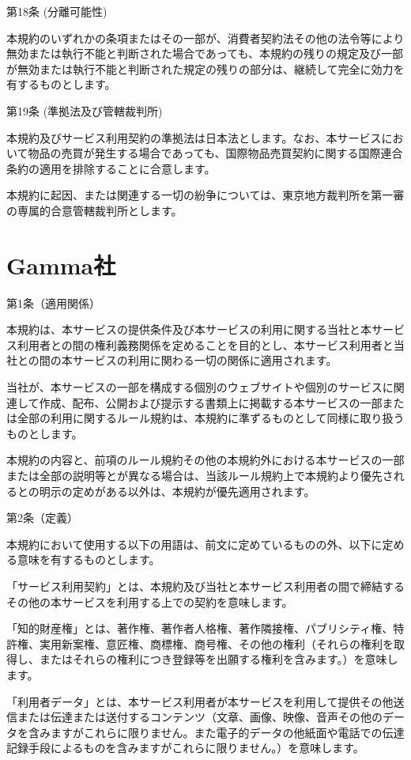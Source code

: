第18条 (分離可能性)

    本規約のいずれかの条項またはその一部が、消費者契約法その他の法令等により無効または執行不能と判断された場合であっても、本規約の残りの規定及び一部が無効または執行不能と判断された規定の残りの部分は、継続して完全に効力を有するものとします。

第19条 (準拠法及び管轄裁判所)

    本規約及びサービス利用契約の準拠法は日本法とします。なお、本サービスにおいて物品の売買が発生する場合であっても、国際物品売買契約に関する国際連合条約の適用を排除することに合意します。

    本規約に起因、または関連する一切の紛争については、東京地方裁判所を第一審の専属的合意管轄裁判所とします。

\section{Gamma社}
第1条（適用関係）

    本規約は、本サービスの提供条件及び本サービスの利用に関する当社と本サービス利用者との間の権利義務関係を定めることを目的とし、本サービス利用者と当社との間の本サービスの利用に関わる一切の関係に適用されます。

    当社が、本サービスの一部を構成する個別のウェブサイトや個別のサービスに関連して作成、配布、公開および提示する書類上に掲載する本サービスの一部または全部の利用に関するルール規約は、本規約に準ずるものとして同様に取り扱うものとします。

    本規約の内容と、前項のルール規約その他の本規約外における本サービスの一部または全部の説明等とが異なる場合は、当該ルール規約上で本規約より優先されるとの明示の定めがある以外は、本規約が優先適用されます。

第2条（定義）

本規約において使用する以下の用語は、前文に定めているものの外、以下に定める意味を有するものとします。

    「サービス利用契約」とは、本規約及び当社と本サービス利用者の間で締結するその他の本サービスを利用する上での契約を意味します。

    「知的財産権」とは、著作権、著作者人格権、著作隣接権、パブリシティ権、特許権、実用新案権、意匠権、商標権、商号権、その他の権利（それらの権利を取得し、またはそれらの権利につき登録等を出願する権利を含みます。）を意味します。

    「利用者データ」とは、本サービス利用者が本サービスを利用して提供その他送信または伝達または送付するコンテンツ（文章、画像、映像、音声その他のデータを含みますがこれらに限りません。また電子的データの他紙面や電話での伝達記録手段によるものを含みますがこれらに限りません。）を意味します。

